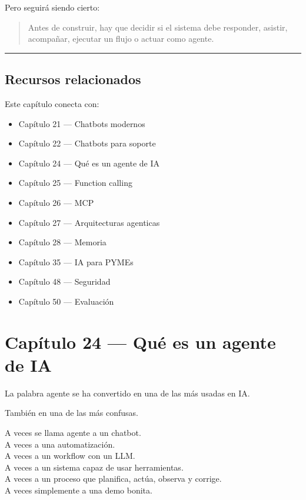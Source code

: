 Pero seguirá siendo cierto:

\begin{quote}
Antes de construir, hay que decidir si el sistema debe responder,
asistir, acompañar, ejecutar un flujo o actuar como agente.
\end{quote}

\begin{center}\rule{0.5\linewidth}{0.5pt}\end{center}

\section{Recursos relacionados}\label{recursos-relacionados-22}

Este capítulo conecta con:

\begin{itemize}
\tightlist
\item
  Capítulo 21 --- Chatbots modernos
\item
  Capítulo 22 --- Chatbots para soporte
\item
  Capítulo 24 --- Qué es un agente de IA
\item
  Capítulo 25 --- Function calling
\item
  Capítulo 26 --- MCP
\item
  Capítulo 27 --- Arquitecturas agenticas
\item
  Capítulo 28 --- Memoria
\item
  Capítulo 35 --- IA para PYMEs
\item
  Capítulo 48 --- Seguridad
\item
  Capítulo 50 --- Evaluación
\end{itemize}

\newpage

\chapter{Capítulo 24 --- Qué es un agente de
IA}\label{capuxedtulo-24-quuxe9-es-un-agente-de-ia}

La palabra agente se ha convertido en una de las más usadas en IA.

También en una de las más confusas.

A veces se llama agente a un chatbot.\\
A veces a una automatización.\\
A veces a un workflow con un LLM.\\
A veces a un sistema capaz de usar herramientas.\\
A veces a un proceso que planifica, actúa, observa y corrige.\\
A veces simplemente a una demo bonita.

